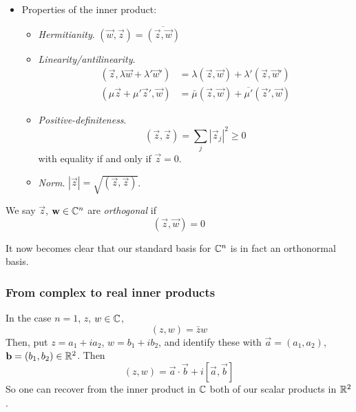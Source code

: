 \documentclass{../../template/note}
\begin{document}
\begin{definition}
\begin{itemize}[resume]
            \item Properties of the inner product:
            \begin{itemize}
                \item \emph{Hermitianity}. \((\vec w, \vec z) = \overline{(\vec z, \vec w)}\) \\
                \item \emph{Linearity/antilinearity}.
                \begin{align*}
                    (\vec z, \lambda \vec w + \lambda ' \vec w') &= \lambda (\vec z, \vec w) + \lambda ' (\vec z, \vec w') \\
                    (\mu \vec z + \mu' \vec z', \vec w) &= \bar \mu (\vec z, \vec w) + \overline{\mu'}(\vec z', \vec w)
                \end{align*}
                \item \emph{Positive-definiteness}.
                \[
                    (\vec z, \vec z) = \sum_j |\vec z_j|^2 \geq 0
                \]
                with equality if and only if \(\vec z = 0\).
                \item \emph{Norm}. \(|\vec z| = \sqrt{(\vec z, \vec z)}\).
            \end{itemize}
        \end{itemize}
    \end{definition}

    \begin{definition}[Orthogonality in \(\CC^n\)]
        We say \(\vec z\), \(\vec w \in \CC^n\) are \emph{orthogonal} if
        \[
            (\vec z, \vec w) = 0
        \]
    \end{definition}
    
    \begin{remark}
        It now becomes clear that our standard basis for \(\CC^n\) is in fact an orthonormal basis.
    \end{remark}
    
    \subsubsection{From complex to real inner products}

    In the case \(n=1\), \(z\), \(w \in \mathbb C\),
    \[  
        (z, w) = \bar z w
    \]
    Then, put \(z = a_1 + ia_2\), \(w = b_1 + ib_2\), and identify these with \(\vec a = (a_1, a_2)\), \(\vec b = (b_1, b_2) \in \RR^2\). Then
    \[  
        (z, w) = \vec a \cdot \vec b + i [\vec a, \vec b]
    \]
    So one can recover from the inner product in \(\mathbb C\) both of our scalar products in \(\mathbb R^2\).
\end{document}
